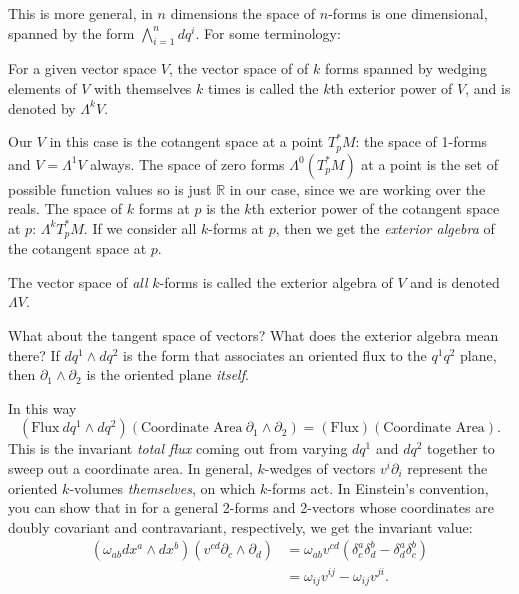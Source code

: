 \documentclass[../master.tex]{subfiles}
\begin{document}
	This is more general, in $n$ dimensions the space of $n$-forms is one dimensional, spanned by the form $\bigwedge_{i=1}^n dq^i$. For some terminology:
	\begin{defn} For a given vector space $V$, the vector space of of $k$ forms spanned by wedging elements of $V$ with themselves $k$ times is called the $k$th exterior power of $V$, and is denoted by $\Lambda^kV$.
	\end{defn}
	Our $V$ in this case is the cotangent space at a point $T^*_p M$: the space of 1-forms and $V = \Lambda^1 V$ always. The space of zero forms $\Lambda^0 (T^*_p M)$ at a point is the set of possible function values so is just $\mathbb R$ in our case, since we are working over the reals. The space of $k$ forms at $p$ is the $k$th exterior power of the cotangent space at $p$: $\Lambda^k T^*_p M$. If we consider all $k$-forms at $p$, then we get the \emph{exterior algebra} of the cotangent space at $p$. 
	\begin{defn}
		The vector space of \emph{all} $k$-forms is called the exterior algebra of $V$ and is denoted $\Lambda V$.
	\end{defn}
	What about the tangent space of vectors? What does the exterior algebra mean there? If $dq^1 \wedge dq^2$ is the form that associates an oriented flux to the $q^1 q^2$ plane, then $\partial_1 \wedge \partial_2$ is the oriented plane \emph{itself}.
	
	In this way 
	\begin{equation*}
		(\text{Flux} ~ dq^1 \wedge dq^2)(\text{Coordinate Area} ~ \partial_1 \wedge \partial_2) = (\text{Flux}) (\text{Coordinate Area}).
	\end{equation*} 
	This is the invariant \emph{total flux} coming out from varying $dq^1$ and $dq^2$ together to sweep out a coordinate area. In general, $k$-wedges of vectors $v^i \partial_i$ represent the oriented $k$-volumes \emph{themselves}, on which $k$-forms act. In Einstein's convention, you can show that in for a general 2-forms and 2-vectors whose coordinates are doubly covariant and contravariant, respectively, we get the invariant value:
	\begin{align*}
		(\omega_{ab} dx^a \wedge dx^b) (v^{cd} \partial_c \wedge \partial_d) &= \omega_{ab} v^{cd} (\delta^{a}_c \delta^{b}_d - \delta^{a}_d \delta^{b}_c)\\
		& = \omega_{ij}v^{ij} - \omega_{ij}v^{ji}.
	\end{align*}
	
\end{document}
